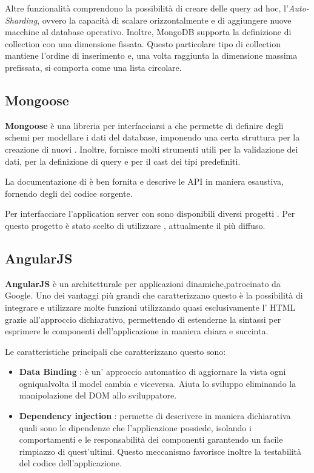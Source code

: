 Altre funzionalità comprendono la possibilità di creare delle query ad hoc, l'\emph{Auto-Sharding}, ovvero la capacità di scalare orizzontalmente e di aggiungere nuove macchine al database operativo. Inoltre, MongoDB supporta la definizione di collection con una dimensione fissata. Questo particolare tipo di collection mantiene l'ordine di inserimento e, una volta raggiunta la dimensione massima prefissata, si comporta come una lista circolare.


\subsection{Mongoose}
\textbf{Mongoose} è una libreria per interfacciarsi a  che permette di definire degli schemi per modellare i dati del database, imponendo una certa struttura per la creazione di nuovi . Inoltre, fornisce molti strumenti utili per la validazione dei dati, per la definizione di query e per il cast dei tipi predefiniti.

La documentazione di  è ben fornita e descrive le API in maniera esaustiva, fornendo degli  del codice sorgente.

Per interfacciare l'application server con  sono disponibili diversi progetti . Per questo progetto è stato scelto di utilizzare , attualmente il più diffuso.


\subsection{AngularJS}
\textbf{AngularJS} è un  architetturale per applicazioni dinamiche,patrocinato da Google.
Uno dei vantaggi più grandi che caratterizzano questo  è la possibilità di integrare e utilizzare molte funzioni utilizzando quasi esclusivamente l' HTML grazie all’approccio dichiarativo, permettendo di estenderne la sintassi per esprimere le componenti dell'applicazione in maniera chiara e succinta.

Le caratteristiche principali che caratterizzano questo  sono: 
\begin{itemize} 
\item \textbf{Data Binding} : è un' approccio automatico di aggiornare la vista ogni ogniqualvolta il model cambia e viceversa. Aiuta lo sviluppo eliminando la manipolazione del DOM allo sviluppatore.
\item \textbf{Dependency injection} : permette di descrivere in maniera dichiarativa quali sono le dipendenze che l'applicazione possiede, isolando i comportamenti e le responsabilità dei componenti garantendo un facile rimpiazzo di quest'ultimi.
Questo meccanismo favorisce inoltre la testabilità del codice dell'applicazione.
\end{itemize}







